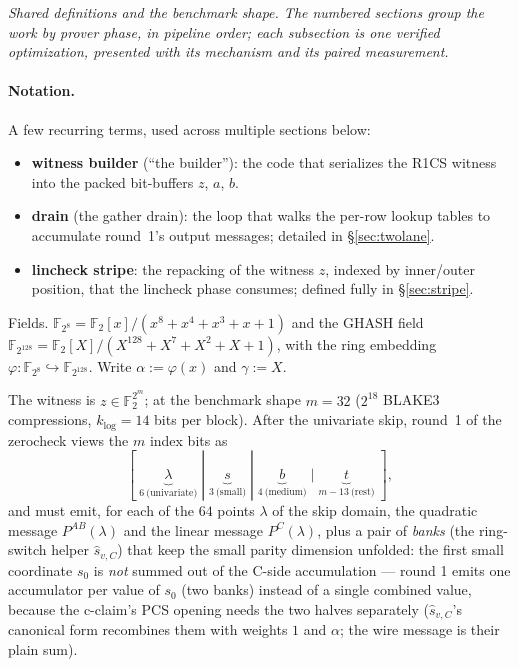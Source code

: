 \documentclass[11pt]{article}
\newcommand{\Ftwo}{\mathbb{F}_2}
\newcommand{\Feight}{\mathbb{F}_{2^8}}
\newcommand{\Fbig}{\mathbb{F}_{2^{128}}}
\begin{document}
\emph{Shared definitions and the benchmark shape. The numbered sections
group the work by prover phase, in pipeline order; each \emph{subsection}
is one verified optimization, presented with its mechanism and its paired
measurement.}

\paragraph{Notation.}
A few recurring terms, used across multiple sections below:
\begin{itemize}
\setlength{\itemsep}{1pt}
\item \textbf{witness builder} (``the builder''): the code that serializes
  the R1CS witness into the packed bit-buffers $z$, $a$, $b$.
\item \textbf{drain} (the gather drain): the loop that walks the per-row
  lookup tables to accumulate round~1's output messages; detailed in
  \S\ref{sec:twolane}.
\item \textbf{lincheck stripe}: the repacking of the witness $z$, indexed
  by inner/outer position, that the lincheck phase consumes; defined
  fully in \S\ref{sec:stripe}.
\end{itemize}


Fields. $\Feight = \Ftwo[x]/(x^8+x^4+x^3+x+1)$ and the GHASH field
$\Fbig = \Ftwo[X]/(X^{128}+X^7+X^2+X+1)$, with the ring embedding
$\varphi:\Feight\hookrightarrow\Fbig$. Write $\alpha := \varphi(x)$ and
$\gamma := X$.

The witness is $z\in\Ftwo^{2^m}$; at the benchmark shape $m=32$
($2^{18}$ BLAKE3 compressions, $k_{\log}=14$ bits per block). After the
univariate skip, round~1 of the zerocheck views the $m$ index bits as
\[
[\;\underbrace{\lambda}_{6\ \text{(univariate)}}\;|\;
 \underbrace{s}_{3\ \text{(small)}}\;|\;
 \underbrace{b}_{4\ \text{(medium)}}\;|\;
 \underbrace{t}_{m-13\ \text{(rest)}}\;],
\]
and must emit, for each of the $64$ points $\lambda$ of the skip domain, the
quadratic message $P^{AB}(\lambda)$ and the linear message $P^{C}(\lambda)$,
plus a pair of \emph{banks} (the ring-switch helper $\hat s_{v,C}$) that keep
the small parity dimension unfolded: the first small coordinate $s_0$ is
\emph{not} summed out of the C-side accumulation --- round 1 emits one
accumulator per value of $s_0$ (two banks) instead of a single combined
value, because the c-claim's PCS opening needs the two halves separately
($\hat s_{v,C}$'s canonical form recombines them with weights $1$ and
$\alpha$; the wire message is their plain sum).
\end{document}
